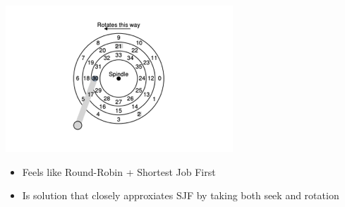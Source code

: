 \documentclass[12pt]{article}
\begin{document}
\begin{itemize}
    \begin{center}
        \includegraphics[width=0.6\linewidth]{../images/midterm_4_solution_54.png}
    \end{center}

    \begin{itemize}
        \item Feels like Round-Robin + Shortest Job First
        \item Is solution that closely approxiates SJF by taking both seek and rotation
    \end{itemize}
\end{itemize}
\end{document}
